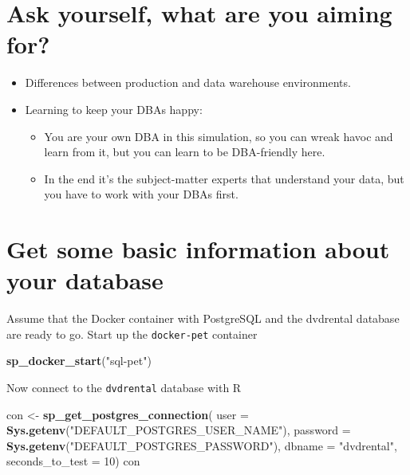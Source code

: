 \documentclass[]{book}
\newenvironment{Shaded}{\begin{snugshade}}{\end{snugshade}}
\newcommand{\DataTypeTok}[1]{\textcolor[rgb]{0.13,0.29,0.53}{#1}}
\newcommand{\DecValTok}[1]{\textcolor[rgb]{0.00,0.00,0.81}{#1}}
\newcommand{\KeywordTok}[1]{\textcolor[rgb]{0.13,0.29,0.53}{\textbf{#1}}}
\newcommand{\NormalTok}[1]{#1}
\newcommand{\StringTok}[1]{\textcolor[rgb]{0.31,0.60,0.02}{#1}}
\providecommand{\tightlist}{%
  \setlength{\itemsep}{0pt}\setlength{\parskip}{0pt}}
\theoremstyle{definition}
\theoremstyle{definition}
\theoremstyle{definition}
\theoremstyle{remark}
\begin{document}
\hypertarget{ask-yourself-what-are-you-aiming-for}{%
\section{Ask yourself, what are you aiming
for?}\label{ask-yourself-what-are-you-aiming-for}}

\begin{itemize}
\tightlist
\item
  Differences between production and data warehouse environments.
\item
  Learning to keep your DBAs happy:

  \begin{itemize}
  \tightlist
  \item
    You are your own DBA in this simulation, so you can wreak havoc and
    learn from it, but you can learn to be DBA-friendly here.
  \item
    In the end it's the subject-matter experts that understand your
    data, but you have to work with your DBAs first.
  \end{itemize}
\end{itemize}

\hypertarget{get-some-basic-information-about-your-database}{%
\section{Get some basic information about your
database}\label{get-some-basic-information-about-your-database}}

Assume that the Docker container with PostgreSQL and the dvdrental
database are ready to go. Start up the \texttt{docker-pet} container

\begin{Shaded}
\begin{Highlighting}[]
\KeywordTok{sp_docker_start}\NormalTok{(}\StringTok{"sql-pet"}\NormalTok{)}
\end{Highlighting}
\end{Shaded}

Now connect to the \texttt{dvdrental} database with R

\begin{Shaded}
\begin{Highlighting}[]
\NormalTok{con <-}\StringTok{ }\KeywordTok{sp_get_postgres_connection}\NormalTok{(}
  \DataTypeTok{user =} \KeywordTok{Sys.getenv}\NormalTok{(}\StringTok{"DEFAULT_POSTGRES_USER_NAME"}\NormalTok{),}
  \DataTypeTok{password =}  \KeywordTok{Sys.getenv}\NormalTok{(}\StringTok{"DEFAULT_POSTGRES_PASSWORD"}\NormalTok{),}
  \DataTypeTok{dbname =} \StringTok{"dvdrental"}\NormalTok{,}
  \DataTypeTok{seconds_to_test =} \DecValTok{10}\NormalTok{)}
\NormalTok{con}
\end{Highlighting}
\end{Shaded}
\end{document}
